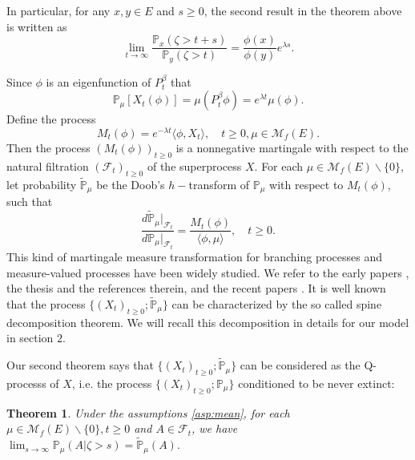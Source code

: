 \documentclass[12pt,a4paper]{amsart}
\numberwithin{equation}{section}
\theoremstyle{plain}
\newtheorem{thm}{Theorem}[section]
\theoremstyle{definition}
\theoremstyle{remark}
\begin{document}
{\color{gray}
In particular, for any $x,y\in E$ and $s\geq 0$, the second result in the theorem above is written as
\begin{equation}\label{ratioresult}
 	\lim_{t\rightarrow\infty}\frac{\mathbb P_x(\zeta>t+s)}{\mathbb P_y(\zeta>t)}=\frac{\phi(x)}{\phi(y)}e^{\lambda s}.
\end{equation}


Since $\phi$ is an eigenfunction of $P_t^\beta$ that
\begin{equation}
	\mathbb P_\mu[X_t(\phi)]= \mu(P_t^\beta \phi)=e^{\lambda t}\mu(\phi).
\end{equation}
Define the process
\[
	M_t(\phi)=e^{-\lambda t}  \langle \phi, X_t\rangle, \quad t\geq 0, \mu\in\mathcal M_f(E).
\]
Then the process  $(M_t(\phi))_{t\geq 0}$ is a nonnegative martingale with respect to the natural filtration $(\mathscr F_t)_{t\geq 0}$ of the superprocess $X$.
For each $\mu \in \mathcal M_f(E)\backslash\{0\}$, let probability $\widetilde{\mathbb P}_\mu$ be the Doob's $h-$transform of $\mathbb P_\mu$ with respect to $M_t(\phi)$, such that
\begin{equation} \label{eq:mt}
	\frac{d\widetilde{\mathbb P}_\mu|_{\mathscr F_t}}{d\mathbb P_\mu|_{\mathscr F_t}}
	=\frac{M_t(\phi)}{\langle\phi,\mu\rangle },
	\quad t\geq 0.
\end{equation}
	This kind of martingale measure transformation for branching processes and measure-valued processes have been widely studied.
	We refer to the early papers \cite{EnglanderKyprianou2004Local,Evans1993Two,RoellyRouault1989Processus}, the thesis \cite{Penisson2010Conditional} and the references therein, and the recent papers \cite{ChampagnatRoelly2008Limit,RenSongSun2017Spine,RenSongZhang2018Williams}.
	It is well known that the process $\{(X_t)_{t\geq 0}; \widetilde{\mathbb P}_{\mu}\}$ can be characterized by the so called spine decomposition theorem.
	We will recall this decomposition in details for our model in section $2$.


Our second theorem says that $\{(X_t)_{t\geq 0}; \widetilde{\mathbb P}_{\mu}\}$ can be considered as the Q-processs of $X$, i.e. the process $\{(X_t)_{t\geq 0}; \mathbb P_{\mu}\}$ conditioned to be never extinct:

\begin{thm}\label{thm: Qprocess}
	Under the assumptions \ref{asp:mean}, for each $\mu \in \mathcal M_f(E)\backslash\{0\}, t\geq 0$ and $A\in\mathscr F_t$, we have
$
	\lim_{s\rightarrow\infty}\mathbb P_\mu(A |\zeta>s)=\widetilde{\mathbb P}_\mu(A).
$
\end{thm}

}
\end{document}

